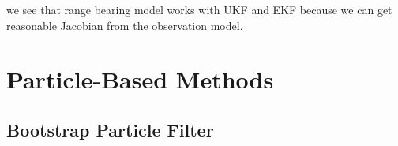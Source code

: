 \documentclass{article}
\begin{document}
we see that range bearing model works with UKF and EKF because we can get reasonable Jacobian from the observation model.







\newpage
\section{Particle-Based Methods}

\subsection{Bootstrap Particle Filter}
\end{document}
